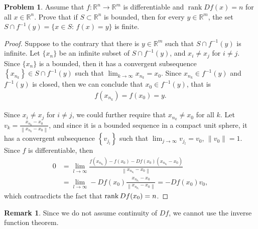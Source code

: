 \documentclass[11pt]{article}
\theoremstyle{definition}
\newtheorem{problem}{Problem}
\newtheorem{remark}{Remark}[problem]
\theoremstyle{definition}
\begin{document}
\begin{problem}
Assume that $f:\mathbb{R}^n\to\mathbb{R}^m$ is differentiable and $\operatorname{rank} Df(x)=n$ for all $x\in\mathbb{R}^n$. Prove that if $S\subset\mathbb{R}^n$ is bounded, then for every $y\in\mathbb{R}^m$, the set $S\cap f^{-1}(y) = \{x\in S: \, f(x) = y\}$ is finite.
\end{problem}
\begin{proof}
Suppose to the contrary that there is $y \in \mathbb{R}^m$ such that $S\cap f^{-1}(y)$ is infinite. Let $\{x_n\}$ be an infinite subset of $S\cap f^{-1}(y)$, and $x_i \neq x_j$ for $i \neq j$. Since $\{x_n\}$ is a bounded, then it has a convergent subsequence $\left\{x_{n_k} \right\} \in S\cap f^{-1}(y)$ such that $\lim_{k \to \infty} x_{n_k} = x_0$. Since $x_{n_k} \in f^{-1}(y)$ and $f^{-1}(y)$ is closed, then we can conclude that $x_0 \in f^{-1}(y)$, that is
\begin{align*}
    f\left(x_{n_k}\right) = f(x_0) = y.
\end{align*}

Since $x_i \neq x_j$ for $i \neq j$, we could further require that $x_{n_k} \neq x_0$ for all $k$. Let $v_k = \frac{x_{n_k} - x_0}{\left\|x_{n_k} - x_0\right\|}$, and since it is a bounded sequence in a compact unit sphere, it has a convergent subsequence $\left\{v_{j_l}\right\}$ such that $\lim_{j\to\infty} v_{j_l} = v_0$, $\|v_0\| = 1$. Since $f$ is differentiable, then 
\begin{align*}
    0 & = \lim_{l\to\infty} \frac{f\left(x_{n_{k_l}}\right) - f(x_0) - Df(x_0)\left(x_{n_{k_l}} - x_0\right)}{\left\| x_{n_{k_l}} - x_0 \right\|} \\
    & = \lim_{l\to\infty} - Df(x_0) \frac{x_{n_{k_l}} - x_0}{\left\| x_{n_{k_l}} - x_0 \right\|} = - Df(x_0) v_0,
\end{align*}
which contracdicts the fact that $\rank Df(x_0) = n$.
\end{proof}
\begin{remark}
Since we do not assume continuity of $Df$, we cannot use the inverse function theorem.
\end{remark}

\medskip
\end{document}
